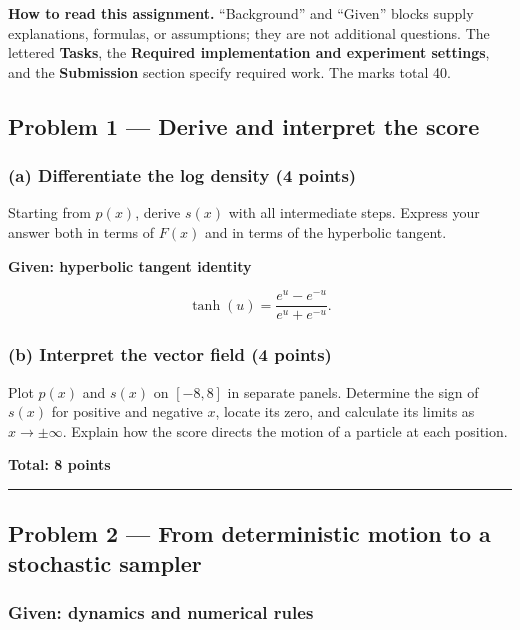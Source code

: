 \documentclass[11pt,a4paper]{article}
\begin{document}
\textbf{How to read this assignment.} ``Background'' and ``Given''
blocks supply explanations, formulas, or assumptions; they are not
additional questions. The lettered \textbf{Tasks}, the \textbf{Required
implementation and experiment settings}, and the \textbf{Submission}
section specify required work. The marks total 40.

\subsection{Problem 1 --- Derive and interpret the
score}\label{problem-1-derive-and-interpret-the-score}

\subsubsection{(a) Differentiate the log density (4
points)}\label{a-differentiate-the-log-density-4-points}

Starting from \(p(x)\), derive \(s(x)\) with all intermediate steps.
Express your answer both in terms of \(F(x)\) and in terms of the
hyperbolic tangent.

\par\noindent\textbf{Given: hyperbolic tangent identity}\par\nopagebreak[4]
\[\tanh(u)=\frac{e^u-e^{-u}}{e^u+e^{-u}}.\]

\subsubsection{(b) Interpret the vector field (4
points)}\label{b-interpret-the-vector-field-4-points}

Plot \(p(x)\) and \(s(x)\) on \([-8,8]\) in separate panels. Determine
the sign of \(s(x)\) for positive and negative \(x\), locate its zero,
and calculate its limits as \(x\to\pm\infty\). Explain how the score
directs the motion of a particle at each position.

\noindent\textbf{Total: 8 points}

\bigskip\hrule\bigskip

\subsection{Problem 2 --- From deterministic motion to a stochastic
sampler}\label{problem-2-from-deterministic-motion-to-a-stochastic-sampler}

\subsubsection{Given: dynamics and numerical
rules}\label{given-dynamics-and-numerical-rules}
\end{document}
